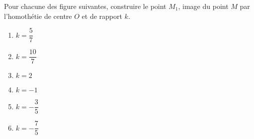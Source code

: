 \begin{exercice*}
    \newcommand{\scaleGdeuxExDix}{0.42}
    Pour chacune des figure suivantes, construire le point $M_1$, image du point $M$ par  l'homothétie de centre $O$
    et de rapport $k$.    
    \begin{enumerate}
        \item $k=\dfrac{5}{7}$
        
        \item $k=\dfrac{10}{7}$
        
        \item $k=2$
        
        \item $k=-1$
        
        \item $k=-\dfrac{3}{5}$
        
        \item $k=-\dfrac{7}{5}$
        
    \end{enumerate}
\end{exercice*}

